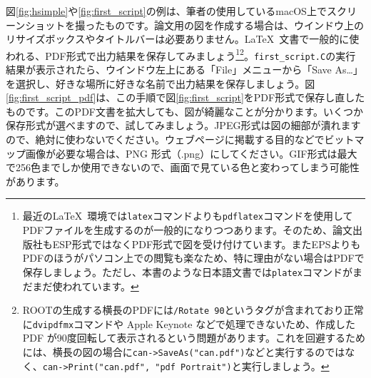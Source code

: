 図\ref{fig:hsimple}や\ref{fig:first_script}の例は、筆者の使用しているmacOS上でスクリーンショットを撮ったものです。論文用の図を作成する場合は、ウインドウ上のリサイズボックスやタイトルバーは必要ありません。\LaTeX\ 文書で一般的に使われる、PDF形式で出力結果を保存してみましょう\footnote{最近の\LaTeX\ 環境では\texttt{latex}コマンドよりも\texttt{pdflatex}コマンドを使用してPDFファイルを生成するのが一般的になりつつあります。そのため、論文出版社もESP形式ではなくPDF形式で図を受け付けています。またEPSよりもPDFのほうがパソコン上での閲覧も楽なため、特に理由がない場合はPDFで保存しましょう。ただし、本書のような日本語文書では\texttt{platex}コマンドがまだまだ使われています。}\footnote{ROOTの生成する横長のPDFには\texttt{/Rotate 90}というタグが含まれており正常に\texttt{dvipdfmx}コマンドや Apple Keynote などで処理できないため、作成した PDF が90度回転して表示されるという問題があります。これを回避するためには、横長の図の場合に\texttt{can->SaveAs("can.pdf")}などと実行するのではなく、\texttt{can->Print("can.pdf", "pdf Portrait")}と実行しましょう。}。\texttt{first\_script.C}の実行結果が表示されたら、ウインドウ左上にある「File」メニューから「Save As\ldots」を選択し、好きな場所に好きな名前で出力結果を保存しましょう。図\ref{fig:first_script_pdf}は、この手順で図\ref{fig:first_script}をPDF形式で保存し直したものです。このPDF文書を拡大しても、図が綺麗なことが分かります。いくつか保存形式が選べますので、試してみましょう。JPEG形式は図の細部が潰れますので、絶対に使わないでください。ウェブページに掲載する目的などでビットマップ画像が必要な場合は、PNG 形式（.png）にしてください。GIF形式は最大で256色までしか使用できないので、画面で見ている色と変わってしまう可能性があります。


